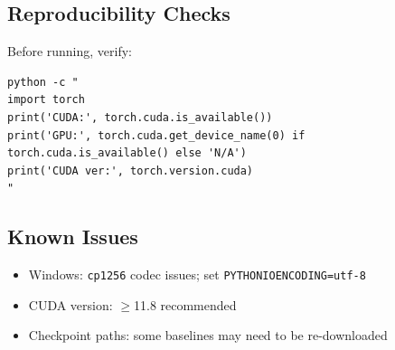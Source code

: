 \subsection{Reproducibility Checks}

Before running, verify:

\begin{lstlisting}
python -c "
import torch
print('CUDA:', torch.cuda.is_available())
print('GPU:', torch.cuda.get_device_name(0) if torch.cuda.is_available() else 'N/A')
print('CUDA ver:', torch.version.cuda)
"
\end{lstlisting}

\subsection{Known Issues}

\begin{itemize}
\item Windows: \texttt{cp1256} codec issues; set \texttt{PYTHONIOENCODING=utf-8}
\item CUDA version: $\ge$11.8 recommended
\item Checkpoint paths: some baselines may need to be re-downloaded
\end{itemize}

